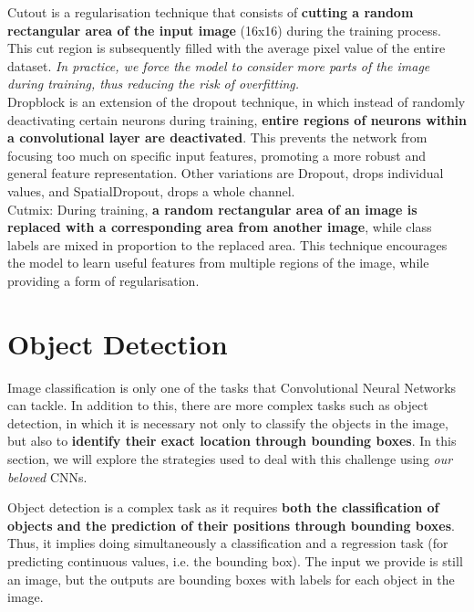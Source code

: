 \begin{outline}
Cutout is a regularisation technique that consists of \textbf{cutting a random rectangular area of the input image} (16x16) during the training process. This cut region is subsequently filled with the average pixel value of the entire dataset. \textit{In practice, we force the model to consider more parts of the image during training, thus reducing the risk of overfitting.} \\

Dropblock is an extension of the dropout technique, in which instead of randomly deactivating certain neurons during training, \textbf{entire regions of neurons within a convolutional layer are deactivated}. This prevents the network from focusing too much on specific input features, promoting a more robust and general feature representation. Other variations are Dropout, drops individual values, and SpatialDropout, drops a whole channel.\\

Cutmix: During training, \textbf{a random rectangular area of an image is replaced with a corresponding area from another image}, while class labels are mixed in proportion to the replaced area. This technique encourages the model to learn useful features from multiple regions of the image, while providing a form of regularisation.
\end{outline}


\section{Object Detection}

Image classification is only one of the tasks that Convolutional Neural Networks can tackle. In addition to this, there are more complex tasks such as object detection, in which it is necessary not only to classify the objects in the image, but also to \textbf{identify their exact location through bounding boxes}. In this section, we will explore the strategies used to deal with this challenge using \textit{our beloved} CNNs.

Object detection is a complex task as it requires \textbf{both the classification of objects and the prediction of their positions through bounding boxes}. Thus, it implies doing simultaneously a classification and a regression task (for predicting continuous values, i.e. the bounding box). The input we provide is still an image, but the outputs are bounding boxes with labels for each object in the image. 

